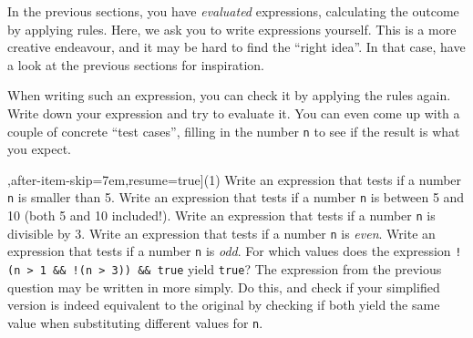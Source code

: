 In the previous sections, you have \emph{evaluated} expressions, calculating the outcome by applying rules. Here, we ask you to write expressions yourself. This is a more creative endeavour, and it may be hard to find the ``right idea''. In that case, have a look at the previous sections for inspiration.

When writing such an expression, you can check it by applying the rules again. Write down your expression and try to evaluate it. You can even come up with a couple of concrete ``test cases'', filling in the number \texttt{n} to see if the result is what you expect.

\vspace*{-\baselineskip}\begin{exercise}
    \begin{longtasks}[counter-format=2.tsk[1],after-item-skip=7em,resume=true](1)
        \task
        Write an expression that tests if a number \texttt{n} is smaller than 5.
        \task
        Write an expression that tests if a number \texttt{n} is between 5 and 10 (both 5 and 10 included!).
        \task
        Write an expression that tests if a number \texttt{n} is divisible by 3.
        \task
        Write an expression that tests if a number \texttt{n} is \emph{even}.
        \task
        Write an expression that tests if a number \texttt{n} is \emph{odd}.
        \task
        For which values does the expression \texttt{!(n > 1 \&\& !(n > 3)) \&\& true} yield \texttt{true}?
        \task
        The expression from the previous question may be written in more simply. Do this, and check if your simplified version is indeed equivalent to the original by checking if both yield the same value when substituting different values for \texttt{n}.
    \end{longtasks}
\end{exercise}



